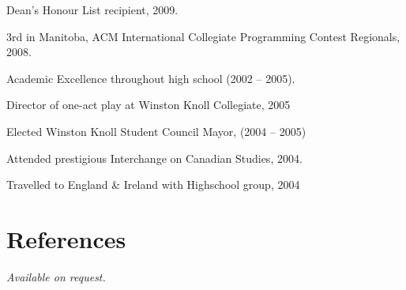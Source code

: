 \documentclass[margin,line,letterpaper]{resume}
\begin{document}
\begin{resume}
  \begin{list2}
    \item Dean's Honour List recipient, 2009.
    \item 3rd in Manitoba, ACM International Collegiate Programming Contest Regionals, 2008.
    \item Academic Excellence throughout high school (2002 -- 2005).
    \item Director of one-act play at Winston Knoll Collegiate, 2005
    \item Elected Winston Knoll Student Council Mayor, (2004 -- 2005)
    \item Attended prestigious Interchange on Canadian Studies, 2004.
    \item Travelled to England \& Ireland with Highschool group, 2004
  \end{list2}

  \section{\mysidestyle References}

  {\sl Available on request.}

\end{resume}
\end{document}
